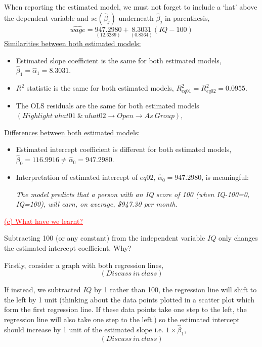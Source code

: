 \documentclass[12pt]{report}
\begin{document}
\noindent When reporting the estimated model, we must not forget to include a `hat' above the dependent variable and $se(\hat{\beta}_j)$ underneath $\hat{\beta}_j$ in parenthesis,
$$\widehat{wage} = \underset{(12.6289)}{947.2980} + \underset{(0.8364)}{8.3031}(IQ-100)$$
\noindent \underline{Similarities between both estimated models:}
\begin{itemize}
	\item Estimated slope coefficient is the same for both estimated models, $\hat{\beta}_1 = \hat{\alpha}_1 = 8.3031$.
	\item $R^2$ statistic is the same for both estimated models, $R^2_{eq01} = R^2_{eq02} = 0.0955$.
	\item The OLS residuals are the same for both estimated models $(Highlight\ uhat01\ \&\ uhat02 \to Open \to As\ Group)$,
	\begin{figure}[H]
		\centering
	\end{figure}
\end{itemize}
\noindent \underline{Differences between both estimated models:}
\begin{itemize}
	\item Estimated intercept coefficient is different for both estimated models, $\hat{\beta}_0 = 116.9916 \neq  \hat{\alpha}_0 = 947.2980$.
	\item Interpretation of estimated intercept of $eq02$, $\hat{\alpha}_0 = 947.2980$, is meaningful: 
	
	\textit{The model predicts that a person with an IQ score of 100 (when IQ-100=0, IQ=100), will earn, on average, \$947.30 per month.}
\end{itemize}
\noindent \textcolor{red}{\underline{(c) What have we learnt?}}

\noindent Subtracting 100 (or any constant) from the independent variable $IQ$ only changes the estimated intercept coefficient. Why?

\noindent Firstly, consider a graph with both regression lines,
$$(Discuss\ in\ class)$$
\vspace{50mm}

\noindent If instead, we subtracted $IQ$ by 1 rather than 100, the regression line will shift to the left by 1 unit (thinking about the data points plotted in a scatter plot which form the first regression line. If these data points take one step to the left, the regression line will also take one step to the left.) so the estimated intercept should increase by 1 unit of the estimated slope i.e. $1\times\hat{\beta}_1$,
$$(Discuss\ in\ class)$$
\vspace{50mm}
\end{document}
